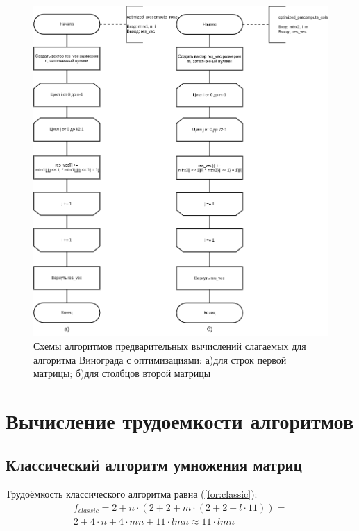 \begin{figure}[H]
	\begin{center}
		\includegraphics[scale=0.57]{img/optimized_winograd_precompute.png}
	\end{center}
	\captionsetup{justification=centering}
	\caption{Схемы алгоритмов предварительных вычислений слагаемых для алгоритма Винограда с оптимизациями:
		а)для строк первой матрицы; б)для столбцов второй матрицы}
	\label{img:optimized_winograd_precompute}
\end{figure}

\section{Вычисление трудоемкости алгоритмов}

\subsection{Классический алгоритм умножения матриц}

Трудоёмкость классического алгоритма равна (\ref{for:classic}):
\begin{equation}
	\label{for:classic}
	\begin{array}{c}
	f_{classic} = 2 + n \cdot (2 + 2 + m \cdot (2 + 2 + l \cdot 11)) = \\ 2 + 4 \cdot n + 4 \cdot mn + 11 \cdot lmn \approx 11 \cdot lmn
	\end{array}
\end{equation}

